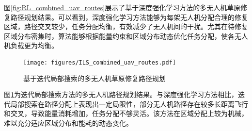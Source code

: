 \documentclass[AutoFakeBold]{LZUThesis}
\begin{document}
图\ref{fig:RL_combined_uav_routes}展示了基于深度强化学习方法的多无人机草原修复路径规划结果。可以看到，深度强化学习方法能够为每架无人机分配合理的修复区域，路径交叉较少，任务分配均衡，有效减少了无人机间的干扰。尤其在待修复区域分布密集时，算法能够根据能量约束和区域分布动态优化任务分配，使各无人机负载更为均衡。

\begin{figure}[H]
	\centering
	\texttt{[image: figures/ILS\_combined\_uav\_routes.pdf]}
	\caption{基于迭代局部搜索的多无人机草原修复路径规划}
	\label{fig:ILS_combined_uav_routes}
\end{figure}

图\ref{fig:ILS_combined_uav_routes}为迭代局部搜索方法的多无人机路径规划结果。与深度强化学习方法相比，迭代局部搜索在路径分配上表现出一定局限性，部分无人机路径存在较多长距离飞行和交叉，导致能量消耗增加，任务分配不够灵活。该方法在区域分配上较为机械，难以充分适应区域分布和能耗的动态变化。
\end{document}
